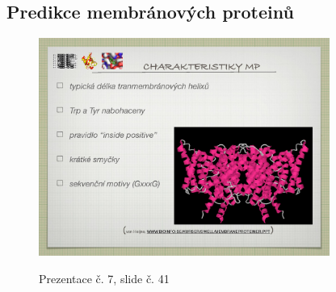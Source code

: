 \documentclass[DIV=8]{scrreprt}
\begin{document}
\subsection{Predikce membránových proteinů} \label{Predikce membránových proteinů}


\begin{figure}
    \caption{Prezentace č. 7, slide č. 41}
    \includegraphics[width=0.85\textwidth]{slides-7/slide-41.jpg}
    \centering
    \label{slides-7-slide-41}
\end{figure}
\end{document}
